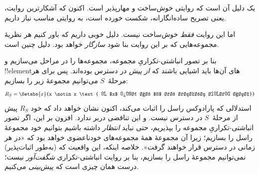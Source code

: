 \documentclass[../../../include/open-logic-section]{subfiles}
\begin{document}
یک دلیل آن است که روایتی خوش‌ساخت و مهارپذیر است. اکنون که آشکارترین
روایت، یعنی تصریح ساده‌انگارانه، شکست خورده است، به روایتی مناسب نیاز داریم.

اما این روایت \emph{فقط} خوش‌ساخت نیست. دلیل خوبی داریم که باور کنیم هر
نظریهٔ مجموعه‌هایی که بر این روایت بنا شود \emph{سازگار} خواهد بود. دلیل
چنین است.

بنا بر تصور انباشتی-تکراریِ مجموعه، مجموعه‌ها را در مراحل می‌سازیم و
!!{element}های آن‌ها باید اشیایی باشند که \emph{از پیش} در دسترس بوده‌اند.
پس برای هر مرحلهٔ~$S$ می‌توانیم مجموعهٔ زیر را بسازیم:
\[
	R_S = \Setabs{x}{x \notin x \text{ و $x$ پیش از $S$ در دسترس بوده است}}
\]
استدلالی که پارادوکس راسل را اثبات می‌کند، اکنون نشان خواهد داد که خود
$R_S$ پیش از مرحلهٔ~$S$ در دسترس نیست. و این تناقضی دربر ندارد. افزون بر
این، اگر تصور انباشتی-تکراریِ مجموعه را بپذیریم، حتی نباید \emph{انتظار}
داشته باشیم بتوانیم خود مجموعهٔ راسل را بسازیم؛ زیرا آن مجموعهٔ همهٔ
مجموعه‌های خودناعضوی خواهد بود که «در هر زمانی در دسترس قرار خواهند
گرفت». خلاصه اینکه، این واقعیت که (به‌طور اثبات‌پذیر) نمی‌توانیم مجموعهٔ
راسل را بسازیم، بنا بر روایت انباشتی-تکراری \emph{شگفت‌آور} نیست؛ درست
همان چیزی است که \emph{پیش‌بینی} می‌کنیم.

%

\end{document}
